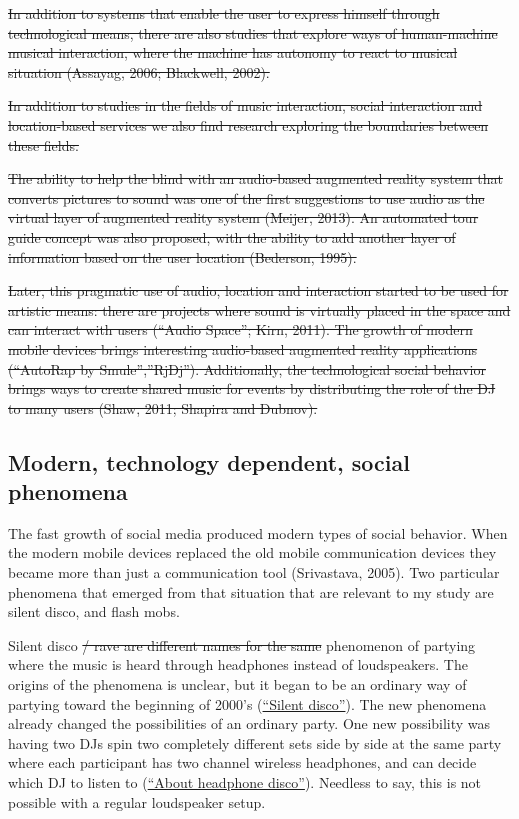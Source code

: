 
\st{In addition to systems that enable the user to express himself through technological means, there are also studies that explore ways of human-machine musical interaction, where the machine has autonomy to react to musical situation (Assayag, 2006; Blackwell, 2002).}

\st{In addition to studies in the fields of music interaction, social interaction and location-based services we also find research exploring the boundaries between these fields.}

\st{The ability to help the blind with an audio-based augmented reality system that converts pictures to sound was one of the first suggestions to use audio as the virtual layer of augmented reality system (Meijer, 2013). An automated tour guide concept was also proposed, with the ability to add another layer of information based on the user location (Bederson, 1995).}

\st{Later, this pragmatic use of audio, location and interaction started to be used for artistic means: there are projects where sound is virtually placed in the space and can interact with users (``Audio Space''; Kirn, 2011). The growth of modern mobile devices brings interesting audio-based augmented reality applications (``AutoRap by Smule'',''RjDj''). Additionally, the technological social behavior brings ways to create shared music for events by distributing the role of the DJ to many users (Shaw, 2011; Shapira and Dubnov).}

\subsection{Modern, technology dependent, social phenomena}


The fast growth of social media produced modern types of social behavior. When the modern mobile devices replaced the old mobile communication devices they became more than just a communication tool (Srivastava, 2005). Two particular phenomena that emerged from that situation that are relevant to my study are silent disco, and flash mobs.

Silent disco \st{/ rave are different names for the same}  phenomenon of partying where the music is heard through headphones instead of loudspeakers. The origins of the phenomena is unclear, but it began to be an ordinary way of partying toward the beginning of 2000's (\href{http://en.wikipedia.org/wiki/Silent_disco}{``Silent disco''}). The new phenomena already changed the possibilities of an ordinary party. One new possibility was having two DJs spin two completely different sets side by side at the same party where each participant has two channel wireless headphones, and can decide which DJ to listen to (\href{http://headphonedisco.com/about.php}{``About headphone disco''}). Needless to say, this is not possible with a regular loudspeaker setup.

